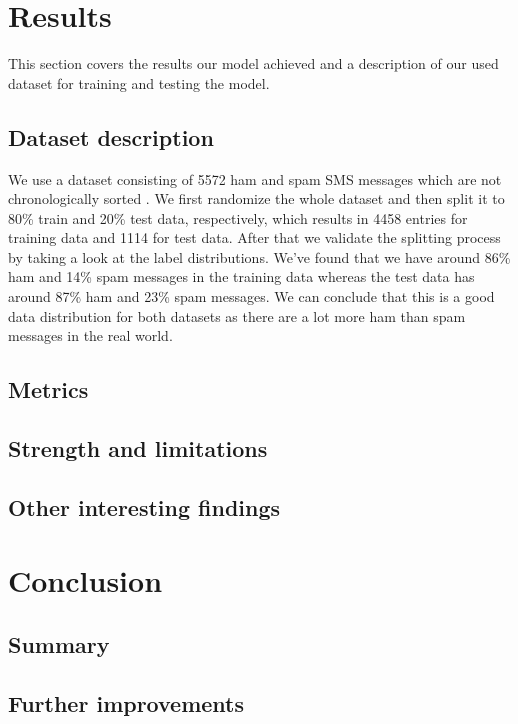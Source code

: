 \section{Results}
This section covers the results our model achieved and a description of our used dataset for training and testing the model.

\subsection{Dataset description}
We use a dataset consisting of 5572 ham and spam SMS messages which are not chronologically sorted \cite{dataset}. We first randomize the whole dataset and then split it to 80\% train and 20\% test data, respectively, which results in 4458 entries for training data and 1114 for test data. After that we validate the splitting process by taking a look at the label distributions. We've found that we have around 86\% ham and 14\% spam messages in the training data whereas the test data has around 87\% ham and 23\% spam messages. We can conclude that this is a good data distribution for both datasets as there are a lot more ham than spam messages in the real world. 

\subsection{Metrics}

\subsection{Strength and limitations}

\subsection{Other interesting findings}

\section{Conclusion}

\subsection{Summary}

\subsection{Further improvements}